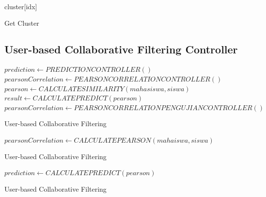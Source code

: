 \begin{algorithm}[H]
  \begin{algorithmic}[1]
        \State \Return cluster[idx]
    \EndProcedure
  \end{algorithmic} 
  \caption{Get Cluster}
  \label{alg:getCluster}
\end{algorithm}

\subsection{User-based Collaborative Filtering Controller}
\label{subsec:user-based}

\begin{algorithm}[H]
  \begin{algorithmic}[1]
        \State $prediction \gets PREDICTIONCONTROLLER()$
            \State $pearsonCorrelation \gets PEARSONCORRELATIONCONTROLLER()$
            \State $pearson \gets CALCULATESIMILARITY (mahasiswa, siswa)$
            \State $result \gets CALCULATEPREDICT(pearson)$
            \State $pearsonCorrelation \gets PEARSONCORRELATIONPENGUJIANCONTROLLER()$
        \EndIf
    \EndProcedure
  \end{algorithmic} 
  \caption{User-based Collaborative Filtering}
  \label{alg:Contruct user-based}
\end{algorithm}

\begin{algorithm}[H]
  \begin{algorithmic}[1]
        \State \Return $pearsonCorrelation \gets CALCULATEPEARSON(mahaiswa, siswa)$
    \EndProcedure
  \end{algorithmic} 
  \caption{User-based Collaborative Filtering}
  \label{alg:calculateSimilarity user-based}
\end{algorithm}

\begin{algorithm}[H]
  \begin{algorithmic}[1]
        \State \Return $prediction \gets CALCULATEPREDICT(pearson)$
    \EndProcedure
  \end{algorithmic} 
  \caption{User-based Collaborative Filtering}
  \label{alg:calculatePredict user-based}
\end{algorithm}

